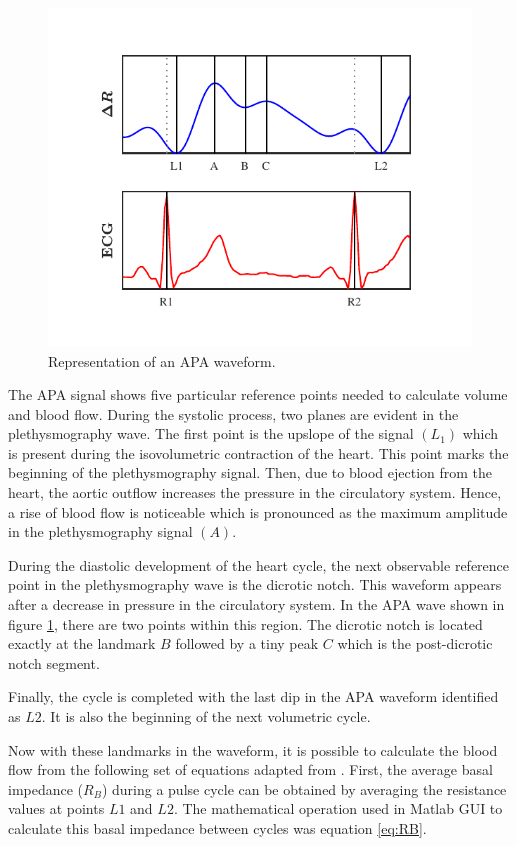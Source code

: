 \begin{figure}[!htpb]
	\centering
	\includegraphics[width=12cm,keepaspectratio]{figure5}
	\caption{Representation of an APA waveform.}
	\label{fig:markers APA}
\end{figure}

The APA signal shows five particular reference points needed to calculate volume and blood flow. During the systolic process, two planes are evident in the plethysmography wave. The first point is the upslope of the signal $(L_{1})$ which is present during the isovolumetric contraction of the heart. This point marks the beginning of the plethysmography signal. Then, due to blood ejection from the heart, the aortic outflow increases the pressure in the circulatory system. Hence, a rise of blood flow is noticeable which is pronounced as the maximum amplitude in the plethysmography signal $(A)$. 

During the diastolic development of the heart cycle, the next observable reference point in the plethysmography wave is the dicrotic notch. This waveform appears after a decrease in pressure in the circulatory system. In the APA wave shown in figure \ref{fig:markers APA}, there are two points within this region. The dicrotic notch is located exactly at the landmark $B$ followed by a tiny peak $C$ which is the post-dicrotic notch segment. 

Finally, the cycle is completed with the last dip in the APA waveform identified as $L2$. It is also the beginning of the next volumetric cycle. 

Now with these landmarks in the waveform, it is possible to calculate the blood flow from the following set of equations adapted from \cite{montgomery2011segmental}. First, the average basal impedance ($R_B$) during a pulse cycle can be obtained by averaging the resistance values at points $L1$ and $L2$. The mathematical operation used in Matlab GUI to calculate this basal impedance between cycles was equation \ref{eq:RB}.

